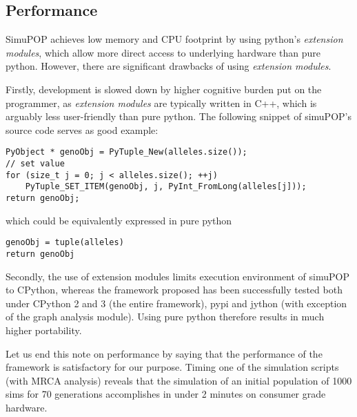 \documentclass{l4proj}
\newif\ifdebug
\begin{document}
\subsection{Performance}

SimuPOP achieves low memory and CPU footprint by using python's \textit{extension modules}, which allow more direct access to underlying hardware than pure python. However, there are significant drawbacks of using \textit{extension modules}.

Firstly, development is slowed down by higher cognitive burden put on the programmer, as \textit{extension modules} are typically written in C++, which is arguably less user-friendly than pure python. The following snippet of simuPOP's source code serves as good example:

\begin{lstlisting}
PyObject * genoObj = PyTuple_New(alleles.size());
// set value
for (size_t j = 0; j < alleles.size(); ++j)
    PyTuple_SET_ITEM(genoObj, j, PyInt_FromLong(alleles[j]));
return genoObj;
\end{lstlisting}

which could be equivalently expressed in pure python 

\begin{lstlisting}
genoObj = tuple(alleles)
return genoObj    
\end{lstlisting}

\ifdebug

Simon suggests to remove this paragraph.

Secondly, a study correlating error rates with programming languages has shown C++ programmers make more errors than python programmers: [cite error rates: macbeth.cs.ucdavis.edu/lang\_study.pdf]. These results must be treated with a pinch of salt -- correlation does not imply causation and arguably more depends on the quality of the programmer than on the quality of programming language, additionally the methodology of parsing commit messages to detect bug fixes employed by this study is rather experimental.
\fi
Secondly, the use of extension modules limits execution environment of simuPOP to CPython, whereas the framework proposed has been successfully tested both under CPython 2 and 3 (the entire framework), pypi and jython (with exception of the graph analysis module). Using pure python therefore results in much higher portability.

Let us end this note on performance by saying that the performance of the framework is satisfactory for our purpose. Timing one of the simulation scripts (with MRCA analysis) reveals that the simulation of an initial population of 1000 sims for 70 generations accomplishes in under 2 minutes on consumer grade hardware.
\end{document}
